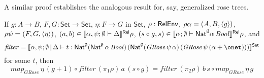 \documentclass{lmcs}
\theoremstyle{plain}\newtheorem{satz}[thm]{Satz}
\newcommand{\set}{\mathsf{Set}}
\newcommand{\semmap}{\mathit{map}}
\newcommand{\filtypeGRose}{\Nat^\emptyset 
 (\Nat^\emptyset \, \alpha \, \mathit{Bool})\, (\Nat^\emptyset 
  (\mathit{GRose}\,\psi \, \alpha) \, (\mathit{GRose}\,\psi \, (\alpha
  + \onet)))}
\begin{document}
\begin{comment}
  Consider the case in which $\rho\alpha = (A, B, \graph{g})$. Then $\relsem{\alpha; \emptyset \vdash List \, \alpha} \rho
  = \graph{\mathit{map}_{\mathit{List}} \, g}$, by Lemma~\ref{lem:list-graph}, and $(xs, xs') \in \graph{\mathit{map}_{\mathit{List}} \,g}$ 
  implies $xs' = \mathit{map}_{\mathit{List}} \,g \,xs$. We also have that 
  $(s, s') \in \graph{g} \to \Eq_{\mathit{Bool}}$ implies 
  $\forall (x, g x) \in \graph{g}. \,\, s x = s' (g x)$ and thus
  $s = s' \circ g$ due to the definition of morphisms between relations.
  With these instantiations, Equation~\ref{eq:filter-thm} becomes
  \begin{align*}
    &(t (\pi_1\rho) \,a \,(s' \circ g) \,xs, t (\pi_2\rho) \,b \,s' \,(\mathit{map}_{\mathit{List}} \,g \,xs)) \in \graph{\mathit{map}_{\mathit{List}} \,g}, \\ 
    & i.e., \\ 
    &\mathit{map}_{\mathit{List}} \,g \, (t (\pi_1\rho) \,a \,(s' \circ g) \,xs) = t (\pi_2\rho) \,b \,s' \,(\mathit{map}_{\mathit{List}} \,g \,xs), \\ 
    & i.e., \\
    &\mathit{map}_{\mathit{List}} \,g \circ t (\pi_1 \rho) \, a \, (s' \circ g) = t (\pi_2\rho) \, b \, s' \circ \mathit{map}_{\mathit{List}} \,g
  \end{align*}
  as desired.
\qed
\end{comment}


A similar proof establishes the analogous result for, say, generalized
rose trees. 
\begin{thm} 
  If $g : A \to B$,
$F, G : \set \to \set$,
  $\eta : F \to G$ in $\set$, $\rho : \mathsf{RelEnv}$, $\rho \alpha =
 (A, B, \langle {g} \rangle)$, $\rho \psi = (F, G, \langle {\eta} \rangle)$, $(a, b) \in
 \llbracket{\alpha, \psi ;\emptyset \vdash \Delta}\rrbracket^{\mathsf{Rel}} \rho$, $(s \circ
 g, s) \in \llbracket{\alpha; \emptyset \vdash \mathsf{Nat}^\emptyset \alpha \,
   \mathit{Bool}}\rrbracket^{\mathsf{Rel}} \rho$, and
 \[ \mathit{filter} = \setsem{\alpha, \psi; \emptyset \,|\, \Delta
      \vdash t : \filtypeGRose}  \]
for some $t$, then
\[ \semmap_{\mathit{GRose}}\, \eta\, (g + 1) \circ \mathit{filter} \,
(\pi_1 \rho) \, a \, (s \circ g) = \mathit{filter} \, (\pi_2\rho) \, b
\, s \circ 
\semmap_{\mathit{GRose}}\, \eta\, g\]
\end{thm}
\end{document}

